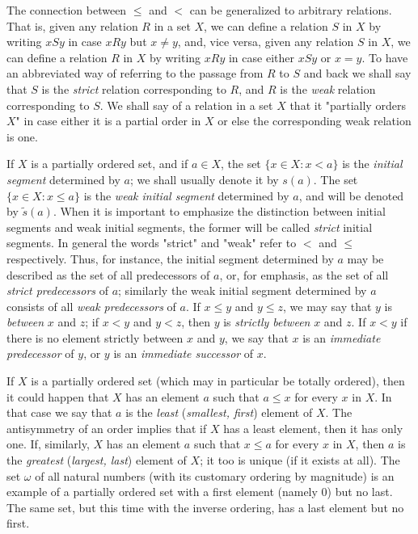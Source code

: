 The connection between $\le$ and $<$ can be generalized to arbitrary relations. That is, given any relation $R$ in a set $X$, we can define a relation $S$ in $X$ by writing $xSy$ in case $xRy$ but $x \neq y$, and, vice versa, given any relation $S$ in $X$, we can define a relation $R$ in $X$ by writing $xRy$ in case either $xSy$ or $x = y$. To have an abbreviated way of referring to the passage from $R$ to $S$ and back we shall say that $S$ is the \textit{strict} relation corresponding to $R$, and $R$ is the \textit{weak} relation corresponding to $S$. We shall say of a relation in a set $X$ that it "partially orders $X$" in case either it is a partial order in $X$ or else the corresponding weak relation is one.

If $X$ is a partially ordered set, and if $a \in X$, the set $\{ x \in X:x < a \}$ is the \textit{initial segment} determined by $a$; we shall usually denote it by $s(a)$. The set $\{ x \in X: x \le a \}$ is the \textit{weak initial segment} determined by $a$, and will be denoted by $\tilde{s}(a)$. When it is important to emphasize the distinction between initial segments and weak initial segments, the former will be called \textit{strict} initial segments. In general the words "strict" and "weak" refer to $<$ and $\le$ respectively. Thus, for instance, the initial segment determined by $a$ may be described as the set of all predecessors of $a$, or, for emphasis, as the set of all \textit{strict predecessors} of $a$; similarly the weak initial segment determined by $a$ consists of all \textit{weak predecessors} of $a$. If $x \le y$ and $y \le z$, we may say that $y$ is \textit{between} $x$ and $z$; if $x < y$ and $y < z$, then $y$ is \textit{strictly between} $x$ and $z$. If $x < y$ if there is no element strictly between $x$ and $y$, we say that $x$ is an \textit{immediate predecessor} of $y$, or $y$ is an \textit{immediate successor} of $x$. 

If $X$ is a partially ordered set (which may in particular be totally ordered), then it could happen that $X$ has an element $a$ such that $a \le x$ for every $x$ in $X$. In that case we say that $a$ is the \textit{least} (\textit{smallest, first}) element of $X$. The antisymmetry of an order implies that if $X$ has a least element, then it has only one. If, similarly, $X$ has an element $a$ such that $x \le a$ for every $x$ in $X$, then $a$ is the \textit{greatest} (\textit{largest, last}) element of $X$; it too is unique (if it exists at all). The set $\omega$ of all natural numbers (with its customary ordering by magnitude) is an example of a partially ordered set with a first element (namely $0$) but no last. The same set, but this time with the inverse ordering, has a last element but no first. 

